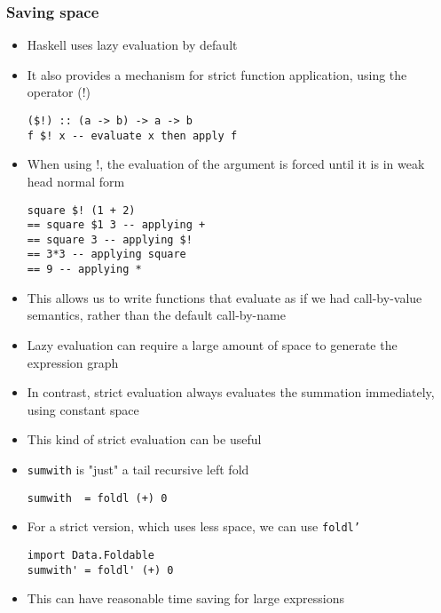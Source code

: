 \documentclass{article}[18pt]
\begin{document}
\subsubsection{Saving space}
\begin{itemize}
	\item Haskell uses lazy evaluation by default
	\item It also provides a mechanism for strict function application, using the operator (\textdollar!)
\begin{verbatim}
($!) :: (a -> b) -> a -> b
f $! x -- evaluate x then apply f
\end{verbatim}
	\item When using \textdollar !, the evaluation of the argument is forced until it is in weak head normal form
\begin{verbatim}
square $! (1 + 2)
== square $1 3 -- applying +
== square 3 -- applying $!
== 3*3 -- applying square
== 9 -- applying *
\end{verbatim}
	\item This allows us to write functions that evaluate as if we had call-by-value semantics, rather than the default call-by-name
	\item Lazy evaluation can require a large amount of space to generate the expression graph
	\item In contrast, strict evaluation always evaluates the summation immediately, using constant space
	\item This kind of strict evaluation can be useful
	\item \texttt{sumwith} is "just" a tail recursive left fold
\begin{verbatim}
sumwith  = foldl (+) 0
\end{verbatim}
	\item For a strict version, which uses less space, we can use \texttt{foldl'}
\begin{verbatim}
import Data.Foldable
sumwith' = foldl' (+) 0
\end{verbatim}
	\item This can have reasonable time saving for large expressions
\end{itemize}
\end{document}
